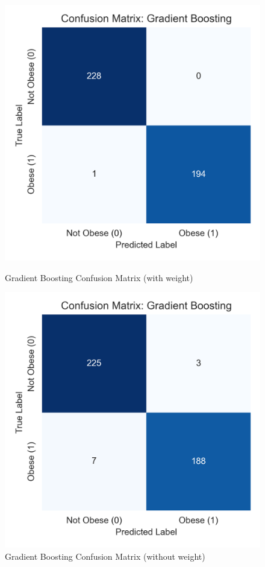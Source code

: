 \documentclass[a4paper,12pt]{article}
\begin{document}
\begin{figure}[H]
\centering
\begin{minipage}{0.35\textwidth}
    \centering
    \includegraphics[width=\linewidth]{gradient_boosting_confusion.png}
    \caption{Gradient Boosting Confusion Matrix (with weight)}
\end{minipage}
\hspace{0.04\textwidth}
\begin{minipage}{0.35\textwidth}
    \centering
    \includegraphics[width=\linewidth]{gradient_boosting_confusion_withoutWeight.png}
    \caption{Gradient Boosting Confusion Matrix (without weight)}
\end{minipage}
\label{fig:gb_weight_comparison}
\end{figure}
\end{document}
